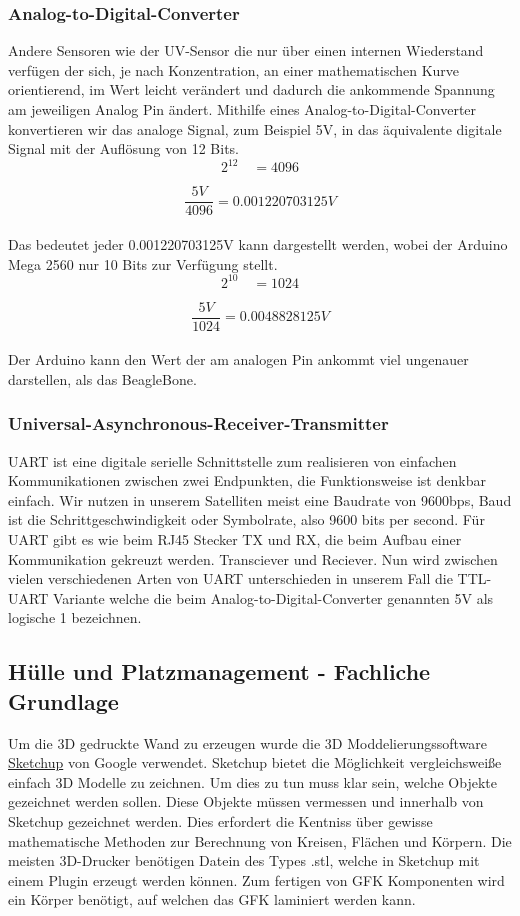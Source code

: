 \subsubsection{Analog-to-Digital-Converter}
Andere Sensoren wie der UV-Sensor die nur über einen internen Wiederstand verfügen der sich, je nach Konzentration, an einer mathematischen Kurve orientierend, im Wert leicht verändert und dadurch die ankommende Spannung am jeweiligen Analog Pin ändert. Mithilfe eines Analog-to-Digital-Converter konvertieren wir das analoge Signal, zum Beispiel 5V, in das äquivalente digitale Signal mit der Auflösung von 12 Bits. \\

\[
2^{12} \quad = 4096
\]

\[
\frac{5V}{4096} = 0.001220703125 V
\] \\

Das bedeutet jeder 0.001220703125V kann dargestellt werden, wobei der Arduino Mega 2560 nur 10 Bits zur Verfügung stellt. \\

\[
2^{10} \quad = 1024
\]

\[
\frac{5V}{1024} = 0.0048828125V
\] \\

Der Arduino kann den Wert der am analogen Pin ankommt viel ungenauer darstellen, als das BeagleBone. 

\subsubsection{Universal-Asynchronous-Receiver-Transmitter}
UART ist eine digitale serielle Schnittstelle zum realisieren von einfachen Kommunikationen zwischen zwei Endpunkten, die Funktionsweise ist denkbar einfach. Wir nutzen in unserem Satelliten meist eine Baudrate von 9600bps, Baud ist die Schrittgeschwindigkeit oder Symbolrate, also 9600 bits per second. Für UART gibt es wie beim RJ45 Stecker TX und RX, die beim Aufbau einer Kommunikation gekreuzt werden. Transciever und Reciever. Nun wird zwischen vielen verschiedenen Arten von UART unterschieden in unserem Fall die TTL-UART Variante welche die beim Analog-to-Digital-Converter genannten 5V als logische 1 bezeichnen. \\

\subsection {Hülle und Platzmanagement - Fachliche Grundlage}
Um die 3D gedruckte Wand zu erzeugen wurde die 3D Moddelierungssoftware \href{http://www.sketchup.com/de} {Sketchup} von Google verwendet. Sketchup bietet die Möglichkeit vergleichsweiße einfach 3D Modelle zu zeichnen. Um dies zu tun muss klar sein, welche Objekte gezeichnet werden sollen. Diese Objekte müssen vermessen und innerhalb von Sketchup gezeichnet werden. Dies erfordert die Kentniss über gewisse mathematische Methoden zur Berechnung von Kreisen, Flächen und Körpern. Die meisten 3D-Drucker benötigen Datein des Types .stl, welche in Sketchup mit einem Plugin erzeugt werden können.
Zum fertigen von GFK Komponenten wird ein Körper benötigt, auf welchen das GFK laminiert werden kann. 

